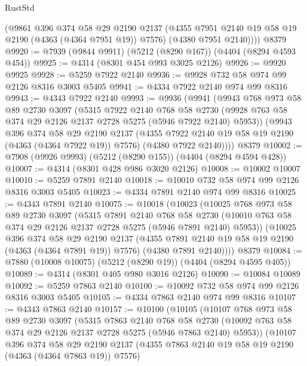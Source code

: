 \begin{lexlean}{RustStd}
\begin{coremodule}
        (@9861
          @396
          @374
          @58
          @29
          @2190
          @2137
          (@4355 @7951 @2140 @19 @58 @19 @2190 (@4363 (@4364 @7951 @19)) @7576)
          (@4380 @7951 @2140))))
    @8379
@9920 := @7939 (@9844 @9911) (@5212 (@8290 @167)) (@4404 (@8294 @4593 @454))
@9925 := @4314 (@8301 @454 @993 @3025 @2126)
@9926 := @9920 @9925
@9928 := @5259 @7922 @2140
@9936 := @9928 @732 @58 @974 @99 @2126 @8316 @3003 @5405
@9941 := @4334 @7922 @2140 @974 @99 @8316
@9943 := @4343 @7922 @2140
@9993 := @9936
    (@9941
      (@9943
        @768
        @973
        @58
        @89
        @2730
        @3097
        (@5315
          @7922
          @2140
          @768
          @58
          @2730
          (@9928 @763 @58 @374 @29 @2126 @2137 @2728 @5275 (@5946 @7922 @2140) @5953))
        (@9943
          @396
          @374
          @58
          @29
          @2190
          @2137
          (@4355 @7922 @2140 @19 @58 @19 @2190 (@4363 (@4364 @7922 @19)) @7576)
          (@4380 @7922 @2140))))
    @8379
@10002 := @7908 (@9926 @9993) (@5212 (@8290 @155)) (@4404 (@8294 @4594 @428))
@10007 := @4314 (@8301 @428 @986 @3020 @2126)
@10008 := @10002 @10007
@10010 := @5259 @7891 @2140
@10018 := @10010 @732 @58 @974 @99 @2126 @8316 @3003 @5405
@10023 := @4334 @7891 @2140 @974 @99 @8316
@10025 := @4343 @7891 @2140
@10075 := @10018
    (@10023
      (@10025
        @768
        @973
        @58
        @89
        @2730
        @3097
        (@5315
          @7891
          @2140
          @768
          @58
          @2730
          (@10010 @763 @58 @374 @29 @2126 @2137 @2728 @5275 (@5946 @7891 @2140) @5953))
        (@10025
          @396
          @374
          @58
          @29
          @2190
          @2137
          (@4355 @7891 @2140 @19 @58 @19 @2190 (@4363 (@4364 @7891 @19)) @7576)
          (@4380 @7891 @2140))))
    @8379
@10084 := @7880 (@10008 @10075) (@5212 (@8290 @19)) (@4404 (@8294 @4595 @405))
@10089 := @4314 (@8301 @405 @980 @3016 @2126)
@10090 := @10084 @10089
@10092 := @5259 @7863 @2140
@10100 := @10092 @732 @58 @974 @99 @2126 @8316 @3003 @5405
@10105 := @4334 @7863 @2140 @974 @99 @8316
@10107 := @4343 @7863 @2140
@10157 := @10100
    (@10105
      (@10107
        @768
        @973
        @58
        @89
        @2730
        @3097
        (@5315
          @7863
          @2140
          @768
          @58
          @2730
          (@10092 @763 @58 @374 @29 @2126 @2137 @2728 @5275 (@5946 @7863 @2140) @5953))
        (@10107
          @396
          @374
          @58
          @29
          @2190
          @2137
          (@4355 @7863 @2140 @19 @58 @19 @2190 (@4363 (@4364 @7863 @19)) @7576)

\end{coremodule}
\end{lexlean}
